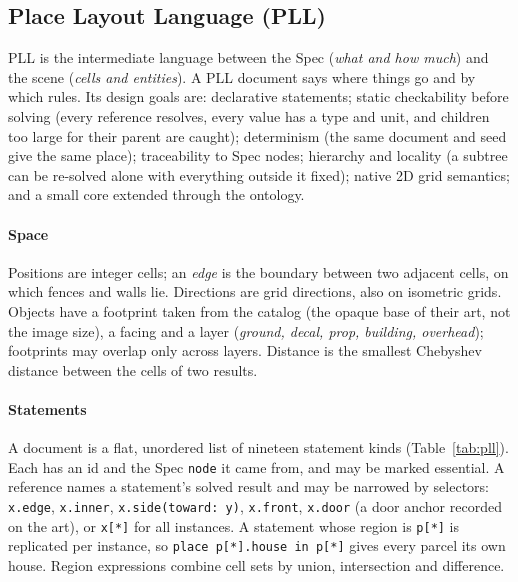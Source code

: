 \documentclass[conference]{IEEEtran}
\begin{document}
\subsection{Place Layout Language (PLL)}
\label{sec:pll}

PLL is the intermediate language between the Spec (\emph{what and how much}) and the
scene (\emph{cells and entities}). A PLL document says where things go and by which
rules. Its design goals are: declarative statements; static checkability before solving
(every reference resolves, every value has a type and unit, and children too large for
their parent are caught); determinism (the same document and seed give the same place);
traceability to Spec nodes; hierarchy and locality (a subtree can be re-solved alone with
everything outside it fixed); native 2D grid semantics; and a small core extended
through the ontology.

\paragraph{Space} Positions are integer cells; an \emph{edge} is the boundary between two
adjacent cells, on which fences and walls lie. Directions are grid directions, also on
isometric grids. Objects have a footprint taken from the catalog (the opaque base of
their art, not the image size), a facing and a layer (\emph{ground, decal, prop,
building, overhead}); footprints may overlap only across layers. Distance is the
smallest Chebyshev distance between the cells of two results.

\paragraph{Statements} A document is a flat, unordered list of nineteen statement kinds
(Table~\ref{tab:pll}). Each has an id and the Spec \texttt{node} it came from, and may be
marked essential. A reference names a statement's solved result and may be narrowed by
selectors: \texttt{x.edge}, \texttt{x.inner}, \texttt{x.side(toward: y)},
\texttt{x.front}, \texttt{x.door} (a door anchor recorded on the art), or
\texttt{x[*]} for all instances. A statement whose region is \texttt{p[*]} is replicated
per instance, so \texttt{place p[*].house in p[*]} gives every parcel its own house.
Region expressions combine cell sets by union, intersection and difference.
\end{document}
